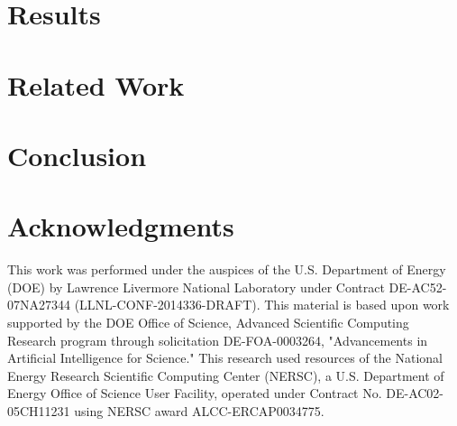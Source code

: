 \documentclass[letterpaper,twocolumn,10pt,dvipsnames]{article}
\begin{document}
\section{Results}\label{sec:results}



\section{Related Work}\label{sec:related-work}


\section{Conclusion}







\section*{Acknowledgments}
This work was performed under the auspices of the U.S. Department of Energy (DOE) by Lawrence Livermore National Laboratory
under Contract DE-AC52-07NA27344 (LLNL-CONF-2014336-DRAFT). This
material is based upon work supported by the DOE Office of Science,
Advanced Scientific Computing Research program through solicitation DE-FOA-0003264, "Advancements in Artificial Intelligence
for Science."
This research used resources of the National Energy Research Scientific Computing Center (NERSC), a U.S. Department of Energy Office of Science User Facility, operated
under Contract No. DE-AC02-05CH11231 using NERSC
award ALCC-ERCAP0034775.





\end{document}
